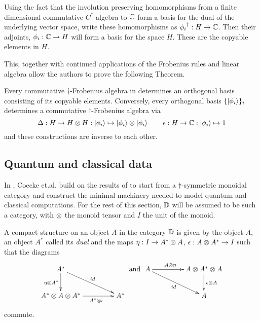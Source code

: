 Using the fact that the involution preserving homomorphisms from a finite dimensional commutative
$C^{*}$-algebra to $\mathbb{C}$ form a basis for the dual of the underlying vector space, write these
homomorphisms as ${\phi_{i}}^{\dagger}:H \to \mathbb{C}$. Then their adjoints, $\phi_{i}:\mathbb{C}\to H$ will form a
basis for the space $H$. These are the copyable elements in $H$.

This, together with continued applications of the Frobenius rules and linear algebra allow the
authors to prove the following Theorem.
\begin{theorem}
  Every commutative $\dagger$-Frobenius algebra in \fdh determines an orthogonal basis consisting
  of its copyable elements. Conversely, every orthogonal basis $\{\left\vert{\phi_{i}}\right\rangle\}_{i}$ determines
  a commutative $\dagger$-Frobenius algebra via \[\Delta:H\to H\otimes H: \left\vert{\phi_{i}}\right\rangle\mapsto
  \left\vert{\phi_{i}}\right\rangle \otimes \left\vert{\phi_{i}}\right\rangle\qquad\epsilon : H\to \mathbb{C} : \left\vert{\phi_{i}}\right\rangle \mapsto 1\] and these
  constructions are inverse to each other.
\end{theorem}


\subsection{Quantum and classical data}\label{sec:quantumclassical}
In \cite{coecke08structures}, Coecke et.al. build on the results of \cite{coeckeetal08:ortho}
to start from a $\dagger$-symmetric monoidal category and construct the minimal machinery needed to
model quantum and classical computations. For the rest of this section, $\mathbb{D}$ will be assumed to be
such a category, with $\otimes$ the monoid tensor and $I$ the unit of the monoid.

\begin{definition}\label{def:compact_structure}
  A compact structure on an object $A$ in the category $\mathbb{D}$ is given by the object $A$, an object
  $A^{*}$ called its \emph{dual} and the maps $\eta:I \to A^{*}\otimes A$, $\epsilon: A\otimes A^{*} \to I$
  such that the diagrams
  \[
    \xymatrix@C+20pt{
      A^{*} \ar[dr]^{id} \ar[d]_{\eta\*A^{*}} \\
      A^{*} \*A\*A^{*}  \ar[r]_(.6){A^{*} \*\epsilon} & A^{*}
    }
    \text{ and }
    \xymatrix@C+20pt{
      A \ar[r]^(.4){A\*\eta} \ar[dr]_{id} & A\* A^{*}\* A \ar[d]^{\epsilon\*A}\\
      & A
    }
  \]
  commute.
\end{definition}

